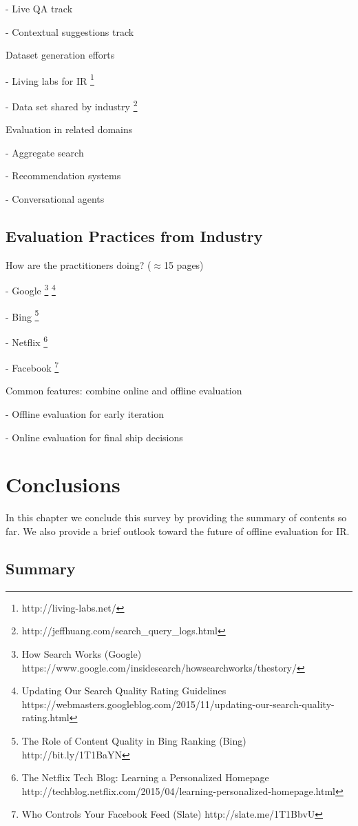 \documentclass[openany]{now} %
\newcommand{\newpar}{\bigskip\noindent}
\begin{document}
- Live QA track

- Contextual suggestions track

\newpar
Dataset generation efforts

- Living labs for IR \footnote{http://living-labs.net/}

- Data set shared by industry \footnote{http://jeffhuang.com/search\_query\_logs.html}

\newpar
Evaluation in related domains

- Aggregate search \cite{Zhou:2013}

- Recommendation systems \cite{gunawardana2015evaluating}

- Conversational agents

\section{Evaluation Practices from Industry}

How are the practitioners doing? (\ensuremath{\approx}15 pages)

-	Google \footnote{How Search Works (Google) https://www.google.com/insidesearch/howsearchworks/thestory/} \footnote{Updating Our Search Quality Rating Guidelines
	 https://webmasters.googleblog.com/2015/11/updating-our-search-quality-rating.html}

-	Bing \footnote{The Role of Content Quality in Bing Ranking (Bing)
	 http://bit.ly/1T1BaYN}

-	Netflix \cite{Gomez-Uribe2015}  \footnote{The Netflix Tech Blog: Learning a Personalized Homepage
	http://techblog.netflix.com/2015/04/learning-personalized-homepage.html}

-	Facebook \footnote{Who Controls Your Facebook Feed (Slate) http://slate.me/1T1BbvU}

\newpar
Common features: combine online and offline evaluation

- Offline evaluation for early iteration

- Online evaluation for final ship decisions

\chapter{Conclusions}

In this chapter we conclude this survey by providing the summary of contents so far. 
We also provide a brief outlook toward the future of offline evaluation for IR.

\section{Summary}
\end{document}
